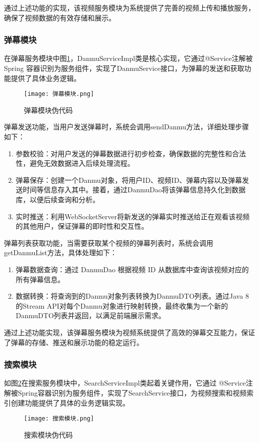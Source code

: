 通过上述功能的实现，该视频服务模块为系统提供了完善的视频上传和播放服务，确保了视频数据的有效存储和展示。

\subsubsection{弹幕模块}
在弹幕服务模块中图\ref{弹幕模块伪代码}，DanmuServiceImpl类是核心实现，它通过@Service注解被 Spring 容器识别为服务组件，实现了DanmuService接口，为弹幕的发送和获取功能提供了具体业务逻辑。
\begin{figure}[hbt]
    \centering
    \texttt{[image: 弹幕模块.png]}
    \caption{弹幕模块伪代码}
    \label{弹幕模块伪代码}
\end{figure}

弹幕发送功能，当用户发送弹幕时，系统会调用sendDanmu方法，详细处理步骤如下：
\begin{enumerate}[label=(\arabic*)]
    \item 参数校验：对用户发送的弹幕数据进行初步检查，确保数据的完整性和合法性，避免无效数据进入后续处理流程。
    \item 弹幕保存：创建一个Danmu对象，将用户ID、视频ID、弹幕内容以及弹幕发送时间等信息存入其中。接着，通过DanmuDao将该弹幕信息持久化到数据库，以便后续查询和分析。
    \item 实时推送：利用WebSocketServer将新发送的弹幕实时推送给正在观看该视频的其他用户，保证弹幕的即时性和交互性。
\end{enumerate}

弹幕列表获取功能，当需要获取某个视频的弹幕列表时，系统会调用getDanmuList方法，具体处理如下：
\begin{enumerate}[label=(\arabic*)]
    \item 弹幕数据查询：通过 DanmuDao 根据视频 ID 从数据库中查询该视频对应的所有弹幕信息。
    \item 数据转换：将查询到的Danmu对象列表转换为DanmuDTO列表。通过Java 8的Stream API对每个Danmu对象进行映射转换，最终收集为一个新的DanmuDTO列表并返回，以满足前端展示需求。
\end{enumerate}

通过上述功能实现，该弹幕服务模块为视频系统提供了高效的弹幕交互能力，保证了弹幕的存储、推送和展示功能的稳定运行。
\subsubsection{搜索模块}

如图\ref{搜索模块伪代码}在搜索服务模块中，SearchServiceImpl类起着关键作用，它通过 @Service注解被Spring容器识别为服务组件，实现了SearchService接口，为视频搜索和视频索引创建功能提供了具体的业务逻辑实现。
\begin{figure}[hbt]
    \centering
    \texttt{[image: 搜索模块.png]}
    \caption{搜索模块伪代码}
    \label{搜索模块伪代码}
\end{figure}

